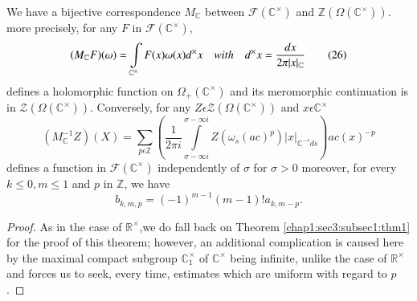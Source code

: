 \begin{theorem}\label{chap1:sec4:subsec3:thm3}  %
  We have a bijective correspondence $M_{\mathbb{C}}$ between
  $\mathscr{F}(\mathbb{C}^\times)$ and
  $\mathbb{Z}(\Omega(\mathbb{C}^\times))$. more precisely, for any $F$ in
  $\mathscr{F}(\mathbb{C}^\times)$,
  \begin{equation*}
    (M_{\mathbb{C}}F)(\omega)=\int\limits_{\mathbb{C}^\times}F(x)\omega(x)d^\times
    x
    \text\quad{with}\quad d^\times
    x=\frac{dx}{2\pi|x|_{\mathbb{C}}}\tag{26}\label{chap1:sec4:subsec3:eq26} 
  \end{equation*}
  defines a holomorphic function on $\Omega_{+}(\mathbb{C}^\times)$ and its
  meromorphic continuation is in
  $\mathscr{Z}(\Omega(\mathbb{C}^\times))$. Conversely, for any
  $Z\epsilon\mathscr{Z}(\Omega(\mathbb{C}^\times))$ and $x\epsilon
  {\mathbb{C}^\times}$ 
  \begin{equation*}
    (M_{\mathbb{C}}^{-1}Z)(X)=\sum\limits_{p\epsilon
      \mathbb{Z}}\left(\frac{1}{2\pi i} \int\limits_{\sigma-\infty
      i}^{\sigma-\infty i}Z(\omega_{s}(ac)^p)|x|_{\mathbb{C}^{-s}
      ds}\right)ac(x)^{-p} 
  \end{equation*}
  defines a function in $\mathscr{F}(\mathbb{C}^\times)$ independently of
  $\sigma$ for $\sigma > 0$ moreover, for every $k\le 0,m\le 1$ and $p$
  in $\mathbb{Z}$, we have 
  \begin{equation*}
    b_{k,m,p}=(-1)^{m-1}(m-1)!a_{k,m-p}.
  \end{equation*}
\end{theorem}

\begin{proof}
As in the case of $\mathbb{R}^\times$,we do fall back on
Theorem \ref{chap1:sec3:subsec1:thm1} for 
the proof of this theorem; however, an additional complication is
caused here by the maximal compact subgroup ${\mathbb{C}_{1}^\times}$ of
$\mathbb{C}^\times$ being infinite, unlike the case of $\mathbb{R}^\times$ and\pageoriginale
forces us to seek, every time, estimates which are uniform with regard
to $p$.
\end{proof}

